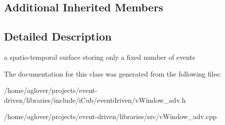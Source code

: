 \subsection*{Additional Inherited Members}


\subsection{Detailed Description}
a spatio-\/temporal surface storing only a fixed number of events 

The documentation for this class was generated from the following files\+:\begin{DoxyCompactItemize}
\item 
/home/aglover/projects/event-\/driven/libraries/include/i\+Cub/eventdriven/v\+Window\+\_\+adv.\+h\item 
/home/aglover/projects/event-\/driven/libraries/src/v\+Window\+\_\+adv.\+cpp\end{DoxyCompactItemize}
